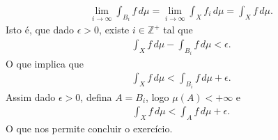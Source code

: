 \begin{homeworkProblem}[1]
\begin{solution}
\begin{enumerate}[a)]
      \begin{align*}
        \lim_{i \to \infty}\int_{B_i}f\,d\mu=\lim_{i \to \infty}\int_{X}f_i\,d\mu=\int_{X}f\,d\mu.
      \end{align*}
      Isto é, que dado $\epsilon>0$, existe $i\in\mathbb{Z}^{+}$ tal que
      \begin{align*}
        \int_{X}f\,d\mu - \int_{B_i}f\,d\mu <\epsilon.
      \end{align*}
      O que implica que
      \begin{align*}
        \int_{X}f\,d\mu < \int_{B_i}f\,d\mu + \epsilon. 
      \end{align*}
      Assim dado $\epsilon>0$, defina $A=B_i$, logo $\mu(A)<+\infty$ e
      \begin{align*}
        \int_{X}f\,d\mu < \int_{A}f\,d\mu + \epsilon. 
      \end{align*}
      O que nos permite concluir o exercício.
  \end{enumerate} 
  \end{solution}
\end{homeworkProblem}
